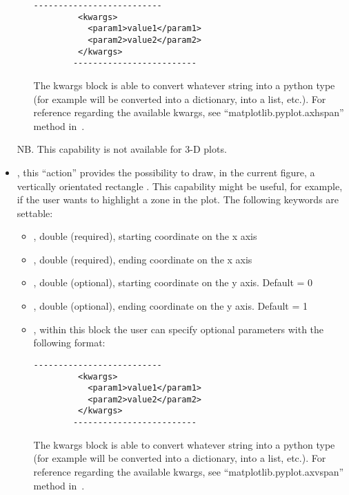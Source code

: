 \begin{itemize}
\begin{itemize}
        \begin{lstlisting}[style=XML]
        --------------------------
         <kwargs>
           <param1>value1</param1>
           <param2>value2</param2>
         </kwargs>
        -------------------------
       \end{lstlisting}
    The kwargs block is able to convert whatever string into a python type (for
    example  will be converted into a
    dictionary,  into a list, etc.).
    For reference regarding the available kwargs, see
    ``matplotlib.pyplot.axhspan'' method in~\cite{MatPlotLib}.
      \end{itemize}
  NB.
  This capability is not available for 3-D plots.
  \item {}, this ``action'' provides the possibility to
  draw, in the current figure, a vertically orientated rectangle .
  This capability might be useful, for example, if the user wants to highlight a
  zone in the plot.
  The following keywords are settable:
    \begin{itemize}
    \item \textit{}, double (required), starting coordinate on the x
    axis
    \item \textit{}, double (required), ending coordinate on the x axis
    \item \textit{}, double (optional), starting coordinate on the y
    axis.
    Default = 0
    \item \textit{}, double (optional), ending coordinate on the y axis.
    Default = 1
    \item \textit{}, within this block the user can specify optional
    parameters with the following format:
        \begin{lstlisting}[style=XML]
        --------------------------
         <kwargs>
           <param1>value1</param1>
           <param2>value2</param2>
         </kwargs>
        -------------------------
       \end{lstlisting}
    The kwargs block is able to convert whatever string into a python type (for
    example  will be converted into a
    dictionary,  into a list, etc.).
    For reference regarding the available kwargs, see
    ``matplotlib.pyplot.axvspan'' method in~\cite{MatPlotLib}.

\end{itemize}
\end{itemize}
